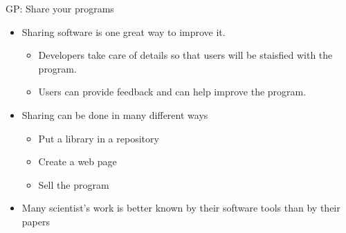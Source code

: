 \documentclass[ignorenonframetext,]{beamer}
\providecommand{\tightlist}{%
  \setlength{\itemsep}{0pt}\setlength{\parskip}{0pt}}
\begin{document}
\begin{frame}{%
\protect\hypertarget{gp-share-your-programs}{%
GP: Share your programs}}

\begin{itemize}
\tightlist
\item
  Sharing software is one great way to improve it.

  \begin{itemize}
  \tightlist
  \item
    Developers take care of details so that users will be staisfied with
    the program.
  \item
    Users can provide feedback and can help improve the program.
  \end{itemize}
\item
  Sharing can be done in many different ways

  \begin{itemize}
  \tightlist
  \item
    Put a library in a repository
  \item
    Create a web page
  \item
    Sell the program
  \end{itemize}
\item
  Many scientist’s work is better known by their software tools than by
  their papers
\end{itemize}

\end{frame}
\end{document}
